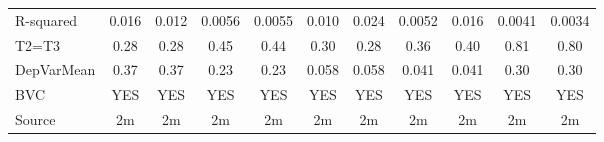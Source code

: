 \begin{tabular}{lcccccccccc}
R-squared & 0.016 & 0.012 & 0.0056 & 0.0055 & 0.010 & 0.024 & 0.0052 & 0.016 & 0.0041 & 0.0034 \\
T2=T3 & 0.28  & 0.28  & 0.45  & 0.44  & 0.30  & 0.28  & 0.36  & 0.40  & 0.81  & 0.80 \\
DepVarMean & 0.37  & 0.37  & 0.23  & 0.23  & 0.058 & 0.058 & 0.041 & 0.041 & 0.30  & 0.30 \\
BVC   & YES   & YES   & YES   & YES   & YES   & YES   & YES   & YES   & YES   & YES \\
Source & 2m    & 2m    & 2m    & 2m    & 2m    & 2m    & 2m    & 2m    & 2m    & 2m \\
\bottomrule
\bottomrule
\end{tabular}%
